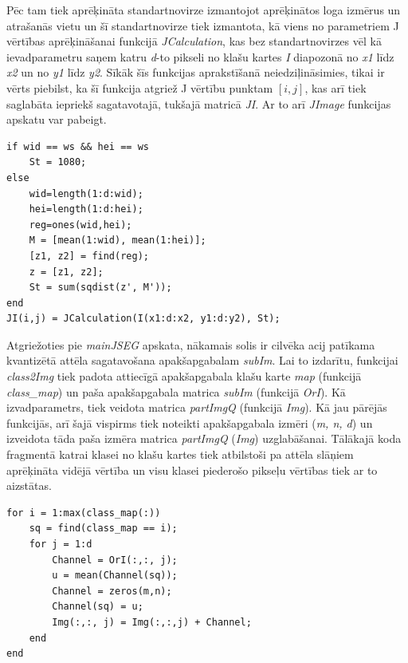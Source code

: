 \documentclass[12pt,paper=a4]{report}
\begin{document}
Pēc tam tiek aprēķināta standartnovirze izmantojot aprēķinātos loga izmērus un atrašanās vietu un šī standartnovirze tiek izmantota, kā viens no parametriem J vērtības aprēķināšanai funkcijā \textit{JCalculation}, kas bez standartnovirzes vēl kā ievadparametru saņem katru \textit{d}-to pikseli no klašu kartes \textit{I} diapozonā no \textit{x1} līdz \textit{x2} un no \textit{y1} līdz \textit{y2}. Sīkāk šīs funkcijas aprakstīšanā neiedziļināsimies, tikai ir vērts piebilst, ka šī funkcija atgriež J vērtību punktam $[i,j]$, kas arī tiek saglabāta iepriekš sagatavotajā, tukšajā matricā \textit{JI}. Ar to arī \textit{JImage} funkcijas apskatu var pabeigt.
\begin{lstlisting}
if wid == ws && hei == ws
	St = 1080; 
else
	wid=length(1:d:wid);
    hei=length(1:d:hei);
    reg=ones(wid,hei);
    M = [mean(1:wid), mean(1:hei)];
    [z1, z2] = find(reg);
    z = [z1, z2];
    St = sum(sqdist(z', M'));
end
JI(i,j) = JCalculation(I(x1:d:x2, y1:d:y2), St);
\end{lstlisting}\par
Atgriežoties pie \textit{mainJSEG} apskata, nākamais solis ir cilvēka acij patīkama kvantizētā attēla sagatavošana apakšapgabalam \textit{subIm}. Lai to izdarītu, funkcijai \textit{class2Img} tiek padota attiecīgā apakšapgabala klašu karte \textit{map} (funkcijā \textit{class_map}) un paša apakšapgabala matrica \textit{subIm} (funkcijā \textit{OrI}). Kā izvadparametrs, tiek veidota matrica \textit{partImgQ} (funkcijā \textit{Img}). Kā jau pārējās funkcijās, arī šajā vispirms tiek noteikti apakšapgabala izmēri (\textit{m, n, d}) un izveidota tāda paša izmēra matrica \textit{partImgQ} (\textit{Img}) uzglabāšanai. Tālākajā koda fragmentā katrai klasei no klašu kartes tiek atbilstoši pa attēla slāņiem aprēķināta vidējā vērtība un visu klasei piederošo pikseļu vērtības tiek ar to aizstātas.
\begin{lstlisting}
for i = 1:max(class_map(:))
	sq = find(class_map == i);
	for j = 1:d       
	    Channel = OrI(:,:, j);
	    u = mean(Channel(sq));
	    Channel = zeros(m,n);
	    Channel(sq) = u;
		Img(:,:, j) = Img(:,:,j) + Channel;
	end
end
\end{lstlisting} \par
\end{document}
